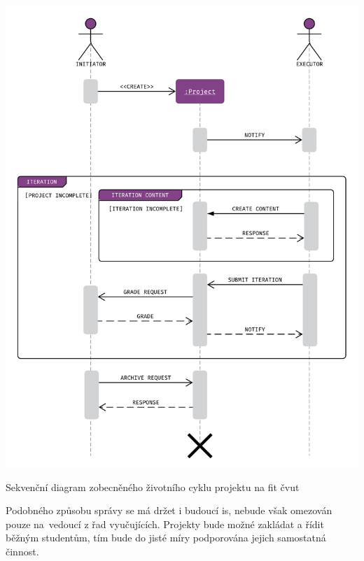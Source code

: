 \begin{fig:illustration}
   \includegraphics[width=1\textwidth]{images/dia-seq-study-project-lifecycle.pdf}
   \caption[Zobecněný životní cyklus projektu]{Sekvenční diagram zobecněného životního cyklu projektu na \gls{fit} \gls{čvut}}\label{pic:dia-seq-study-project-lifecycle}
\end{fig:illustration}


Podobného způsobu správy se má držet i budoucí \gls{is}, nebude však omezován pouze na~vedoucí z řad vyučujících. Projekty bude možné zakládat a řídit běžným studentům, tím bude do jisté míry podporována jejich samostatná činnost.




